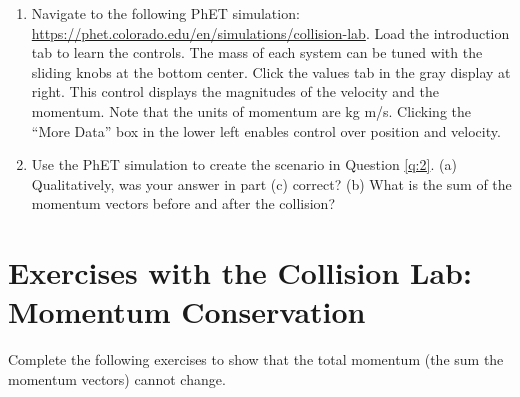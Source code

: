\documentclass{article}
\begin{document}
\begin{enumerate}
\item Navigate to the following PhET simulation: \url{https://phet.colorado.edu/en/simulations/collision-lab}.  Load the introduction tab to learn the controls.  The mass of each system can be tuned with the sliding knobs at the bottom center.  Click the values tab in the gray display at right.  This control displays the magnitudes of the velocity and the momentum.  Note that the units of momentum are kg m/s.  Clicking the ``More Data'' box in the lower left enables control over position and velocity.
\item Use the PhET simulation to create the scenario in Question \ref{q:2}. (a) Qualitatively, was your answer in part (c) correct? (b) What is the sum of the momentum vectors before and after the collision?
\end{enumerate}

\clearpage

\section{Exercises with the Collision Lab: Momentum Conservation}

Complete the following exercises to show that the total momentum (the sum the momentum vectors) cannot change.
\end{document}
